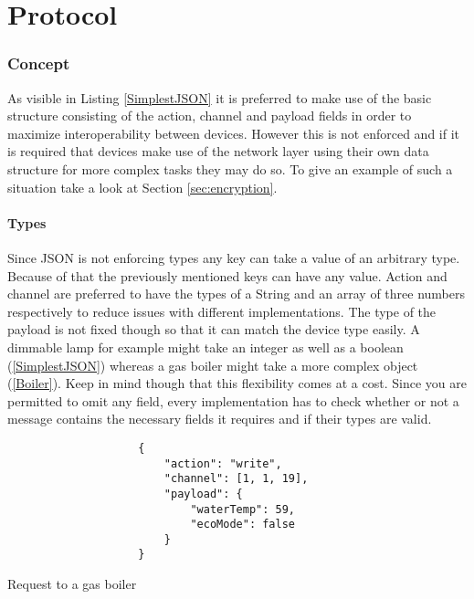 \documentclass[11pt,a4paper, titlepage]{article}
\begin{document}
	\newpage
				
	\part{Protocol}
		\label{part:protocol}
		
		\section{Concept}
			As visible in Listing \ref{SimplestJSON} it is preferred to make use of the basic structure consisting of the action, channel and payload fields in order to maximize interoperability between devices. However this is not enforced and if it is required that devices make use of the network layer using their own data structure for more complex tasks they may do so. To give an example of such a situation take a look at Section \ref{sec:encryption}.
			\subsection{Types}
				Since JSON is not enforcing types any key can take a value of an arbitrary type. Because of that the previously mentioned keys can have any value. Action and channel are preferred to have the types of a String and an array of three numbers respectively to reduce issues with different implementations. The type of the payload is not fixed though so that it can match the device type easily. A dimmable lamp for example might take an integer as well as a boolean (\ref{SimplestJSON}) whereas a gas boiler might take a more complex object (\ref{Boiler}). Keep in mind though that this flexibility comes at a cost. Since you are permitted to omit any field, every implementation has to check whether or not a message contains the necessary fields it requires and if their types are valid.
				\begin{listing}
					\begin{verbatim}
					{
						"action": "write",
						"channel": [1, 1, 19],
						"payload": {
							"waterTemp": 59,
							"ecoMode": false
						}
					}
					\end{verbatim}
					\caption{Request to a gas boiler}
					\label{Boiler}
				\end{listing}
			
\end{document}
